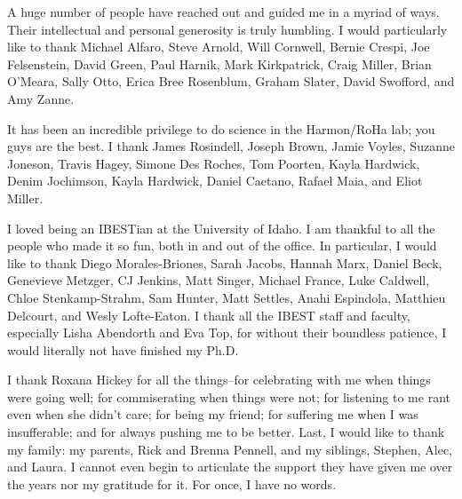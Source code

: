 A huge number of people have reached out and guided me in a myriad of ways. Their intellectual and personal generosity is truly humbling. I would particularly like to thank Michael Alfaro, Steve Arnold, Will Cornwell, Bernie Crespi, Joe Felsenstein, David Green, Paul Harnik, Mark Kirkpatrick, Craig Miller, Brian O'Meara, Sally Otto, Erica Bree Rosenblum, Graham Slater, David Swofford, and Amy Zanne.

It has been an incredible privilege to do science in the Harmon/RoHa lab; you guys are the best. I thank James Rosindell, Joseph Brown, Jamie Voyles, Suzanne Joneson, Travis Hagey, Simone Des Roches, Tom Poorten, Kayla Hardwick, Denim Jochimson, Kayla Hardwick, Daniel Caetano, Rafael Maia, and Eliot Miller.

I loved being an IBESTian at the University of Idaho. I am thankful to all the people who made it so fun, both in and out of the office. In particular, I would like to thank Diego Morales-Briones, Sarah Jacobs, Hannah Marx, Daniel Beck, Genevieve Metzger, CJ Jenkins, Matt Singer, Michael France, Luke Caldwell, Chloe Stenkamp-Strahm, Sam Hunter, Matt Settles, Anahi Espindola, Matthieu Delcourt, and Wesly Lofte-Eaton. I thank all the IBEST staff and faculty, especially Lisha Abendorth and Eva Top, for without their boundless patience, I would literally not have finished my Ph.D.

I thank Roxana Hickey for all the things--for celebrating with me when things were going well; for commiserating when things were not; for listening to me rant even when she didn't care; for being my friend; for suffering me when I was insufferable; and for always pushing me to be better. Last, I would like to thank my family: my parents, Rick and Brenna Pennell, and my siblings, Stephen, Alec, and Laura. I cannot even begin to articulate the support they have given me over the years nor my gratitude for it. For once, I have no words.


